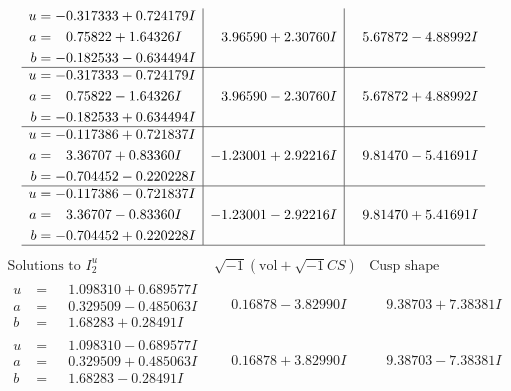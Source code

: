 \documentclass[1p]{elsarticle_modified}
\theoremstyle{definition}
\newcommand{\I}{\sqrt{-1}}
\begin{document}
$$\begin{array}{c|c|c}
\begin{aligned}
u &= -0.317333 + 0.724179 I \\
a &= \phantom{-}0.75822 + 1.64326 I \\
b &= -0.182533 - 0.634494 I\end{aligned}
 & \phantom{-}3.96590 + 2.30760 I & \phantom{-}5.67872 - 4.88992 I \\ \hline\begin{aligned}
u &= -0.317333 - 0.724179 I \\
a &= \phantom{-}0.75822 - 1.64326 I \\
b &= -0.182533 + 0.634494 I\end{aligned}
 & \phantom{-}3.96590 - 2.30760 I & \phantom{-}5.67872 + 4.88992 I \\ \hline\begin{aligned}
u &= -0.117386 + 0.721837 I \\
a &= \phantom{-}3.36707 + 0.83360 I \\
b &= -0.704452 - 0.220228 I\end{aligned}
 & -1.23001 + 2.92216 I & \phantom{-}9.81470 - 5.41691 I \\ \hline\begin{aligned}
u &= -0.117386 - 0.721837 I \\
a &= \phantom{-}3.36707 - 0.83360 I \\
b &= -0.704452 + 0.220228 I\end{aligned}
 & -1.23001 - 2.92216 I & \phantom{-}9.81470 + 5.41691 I\\
 \hline 
 \end{array}$$\newpage$$\begin{array}{c|c|c}  
\text{Solutions to }I^u_{2}& \I (\text{vol} + \sqrt{-1}CS) & \text{Cusp shape}\\
 \hline 
\begin{aligned}
u &= \phantom{-}1.098310 + 0.689577 I \\
a &= \phantom{-}0.329509 - 0.485063 I \\
b &= \phantom{-}1.68283 + 0.28491 I\end{aligned}
 & \phantom{-}0.16878 - 3.82990 I & \phantom{-}9.38703 + 7.38381 I \\ \hline\begin{aligned}
u &= \phantom{-}1.098310 - 0.689577 I \\
a &= \phantom{-}0.329509 + 0.485063 I \\
b &= \phantom{-}1.68283 - 0.28491 I\end{aligned}
 & \phantom{-}0.16878 + 3.82990 I & \phantom{-}9.38703 - 7.38381 I \\ \hline\begin{aligned}

\end{aligned}
\end{array}$$
\end{document}
